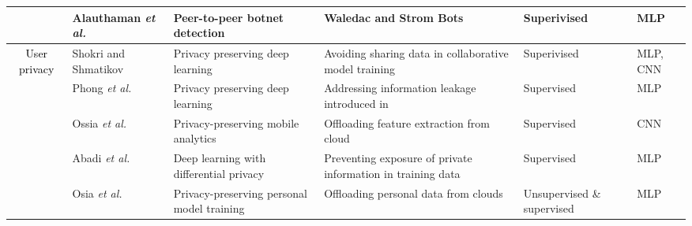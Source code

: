 \documentclass[journal,comsoc,letter]{IEEEtran}
\newcommand{\edit}[1]{\textcolor{black}{#1}}
\begin{document}
\begin{table*}[h!]
\begin{tabular}{|c|C{2.1cm}|C{3.3cm}|C{6cm}|C{1.7cm}|C{1.7cm}|}
                                      & Alauthaman \emph{et al.} \cite{alauthaman2016p2p}        & Peer-to-peer botnet detection                                   & Waledac and Strom Bots                                                                                                                & Superivised                & MLP                                                      \\ \hline
\multirow{11}{*}{\edit{User privacy}}   & Shokri and Shmatikov \cite{shokri2015privacy}            & Privacy preserving deep learning                                & Avoiding sharing data in collaborative model training                                                                                 & Superivised                & MLP, CNN                                                 \\  
                                      & Phong \emph{et al.} \cite{aono2017privacy}               & Privacy preserving deep learning                                & Addressing information leakage introduced in~\cite{shokri2015privacy}                                                                 & Supervised                 & MLP                                                      \\  
                                      & Ossia \emph{et al.} \cite{ossia2017hybrid}               & Privacy-preserving mobile analytics                             & Offloading feature extraction from cloud                                                                                              & Supervised                 & CNN                                                      \\  
                                      & Abadi \emph{et al.} \cite{abadi2016deep}                 & Deep learning with differential privacy                         & Preventing exposure of private information in training data                                                                           & Supervised                 & MLP                                                      \\  
                                      & Osia \emph{et al.} \cite{osia2017privacy}                & Privacy-preserving personal model training                      & Offloading personal data from clouds                                                                                                  & Unsupervised \& supervised & MLP \\  

\end{tabular}
\end{table*}
\end{document}
